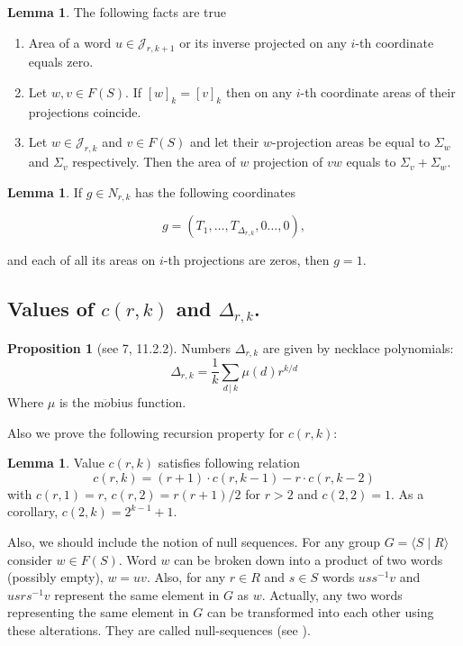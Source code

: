 \documentclass[11pt]{amsart}
\theoremstyle{plain}
\theoremstyle{definition}
\newtheorem{Lemma}[Theorem]{Lemma}
\newtheorem{Proposition}[Theorem]{Proposition}
\numberwithin{equation}{section}
\newcommand{\JJ}{\mathcal{J}_{r,k}}
\newcommand{\Nrk}{N_{r,k}}
\begin{document}
\begin{Lemma}\label{Area lemma}The following facts are true
\begin{enumerate}
    \item Area of a word $u\in \mathcal{J}_{r,k+1}$ or its inverse projected on any $i$-th coordinate equals zero.
    \item Let $w,v \in F(S)$. If $[w]_k = [v]_k$ then on any $i$-th coordinate areas of their projections coincide.
    \item Let $w\in \JJ$ and $v \in F(S)$ and let their $w$-projection areas be equal to $\Sigma_w$ and $\Sigma_v$ respectively. Then the area of $w$ projection of $vw$ equals to $\Sigma_v+\Sigma_w$.
\end{enumerate}
\end{Lemma}


\begin{Lemma}\label{govno}
If $g\in \Nrk$ has the following coordinates

$$g = (T_1,\ldots, T_{\Delta_{r,k}},0\ldots,0), $$

and each of all its areas on $i$-th projections are zeros, then $g = 1$.
\end{Lemma}

\subsection{Values of $c(r,k)$ and $\Delta_{r,k}$.}
\begin{Proposition}[see \cite{loh} 7, 11.2.2]
Numbers $\Delta_{r,k}$ are given by necklace polynomials: 
$$\Delta_{r,k} = \frac{1}{k}\sum_{d \,| \,k}\mu(d)r^{k/d}$$
Where $\mu$ is the m$\ddot o$bius function.
\end{Proposition}

Also we prove the following recursion property for $c(r,k)$:

\begin{Lemma}\label{crk}
Value $c(r,k)$ satisfies following relation
$$c(r, k) = (r + 1) \cdot c(r, k - 1) -  r \cdot c(r, k - 2)$$
with $c(r,1) = r$, $c(r,2) = r(r+1)/2$ for $r>2$ and $c(2,2)=1$.
As a corollary, $c(2,k) = 2^{k-1}+1$. 
\end{Lemma}



Also, we should include the notion of null sequences. For any group $G = \langle S \; | \; R \rangle$ consider $w\in F(S)$. Word $w$ can be broken down into a product of two words (possibly empty), $w=uv$. Also, for any $r \in R$ and $s\in S$ words $uss^{-1}v$ and $usrs^{-1}v$ represent the same element in $G$ as $w$. Actually, any two words representing the same element in $G$ can be transformed into each other using these alterations. They are called null-sequences (see \cite{hours}). 
\end{document}
